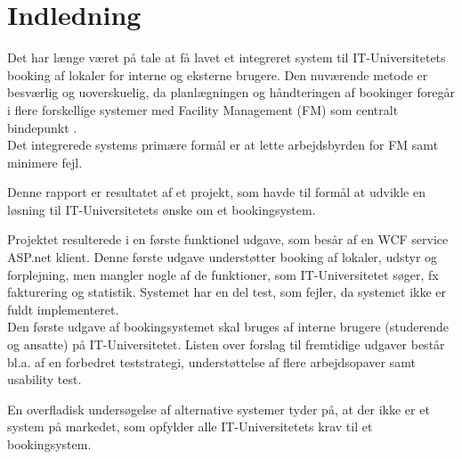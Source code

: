 \chapter{Indledning}
\label{Intro}
Det har længe været på tale at få lavet et integreret system til IT-Universitetets booking af lokaler for interne og eksterne brugere. Den nuværende metode er besværlig og uoverskuelig, da planlægningen og håndteringen af bookinger foregår i flere forskellige systemer med Facility Management (FM) som centralt bindepunkt \cite[Kap. A]{kravspec}.
\\Det integrerede systems primære formål er at lette arbejdsbyrden for FM samt minimere fejl. 

Denne rapport er resultatet af et projekt, som havde til formål at udvikle en løsning til IT-Universitetets ønske om et bookingsystem.

Projektet resulterede i en første funktionel udgave, som besår af en WCF service ASP.net klient. Denne første udgave understøtter booking af lokaler, udstyr og forplejning, men mangler nogle af de funktioner, som IT-Universitetet søger, fx fakturering og statistik. Systemet har en del test, som fejler, da systemet ikke er fuldt implementeret.
\\Den første udgave af bookingsystemet skal bruges af interne brugere (studerende og ansatte) på IT-Universitetet. Listen over forslag til fremtidige udgaver består bl.a. af en forbedret teststrategi, understøttelse af flere arbejdsopaver samt usability test.

En overfladisk undersøgelse af alternative systemer tyder på, at der ikke er et system på markedet, som opfylder alle IT-Universitetets krav til et bookingsystem.